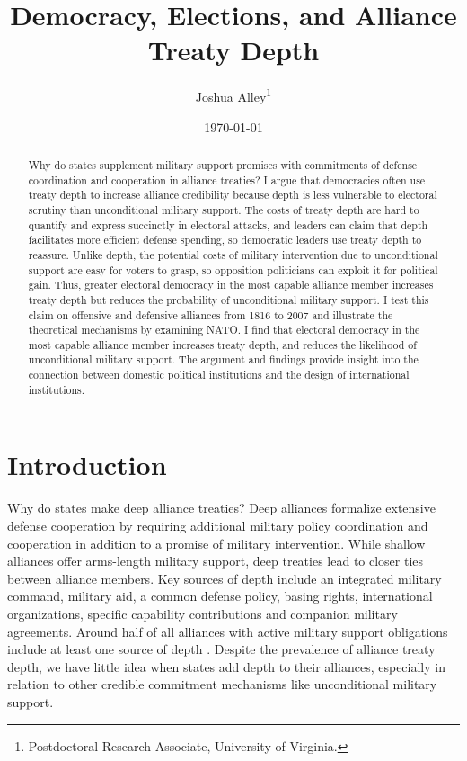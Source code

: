 \documentclass[12pt]{article}
\title{\textbf{Democracy, Elections, and Alliance Treaty Depth}}
\author{Joshua Alley\footnote{Postdoctoral Research Associate,
University of Virginia.}}
\date{\today}
\begin{document}
\maketitle 

\doublespace 

\begin{abstract}
Why do states supplement military support promises with commitments of defense coordination and cooperation in alliance treaties? 
I argue that democracies often use treaty depth to increase alliance credibility because depth is less vulnerable to electoral scrutiny than unconditional military support. 
The costs of treaty depth are hard to quantify and express succinctly in electoral attacks, and leaders can claim that depth facilitates more efficient defense spending, so democratic leaders use treaty depth to reassure. 
Unlike depth, the potential costs of military intervention due to unconditional support are easy for voters to grasp, so opposition politicians can exploit it for political gain. 
Thus, greater electoral democracy in the most capable alliance member increases treaty depth but reduces the probability of unconditional military support. 
I test this claim on offensive and defensive alliances from 1816 to 2007 and illustrate the theoretical mechanisms by examining NATO. 
I find that electoral democracy in the most capable alliance member increases treaty depth, and reduces the likelihood of unconditional military support. 
The argument and findings provide insight into the connection between domestic political institutions and the design of international institutions. 
\end{abstract}


\newpage 


\section{Introduction}


Why do states make deep alliance treaties? 
Deep alliances formalize extensive defense cooperation by requiring additional military policy coordination and cooperation in addition to a promise of military intervention. 
While shallow alliances offer arms-length military support, deep treaties lead to closer ties between alliance members. 
Key sources of depth include an integrated military command, military aid, a common defense policy, basing rights, international organizations, specific capability contributions and companion military agreements. 
Around half of all alliances with active military support obligations include at least one source of depth \citep{Leedsetal2002}. 
Despite the prevalence of alliance treaty depth, we have little idea when states add depth to their alliances, especially in relation to other credible commitment mechanisms like unconditional military support. 
\end{document}
